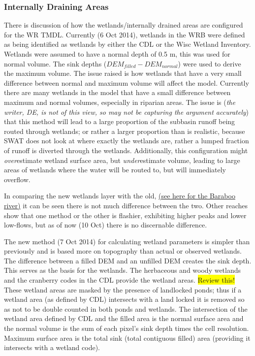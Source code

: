 \documentclass[10pt,letterpaper]{article}%
\begin{document}
		\subsubsection{Internally Draining Areas}
		There is discussion of how the wetlands/internally drained areas are configured for the WR TMDL. Currently (6 Oct 2014), wetlands in the WRB were defined as being identified as wetlands by either the CDL or the Wisc Wetland Inventory. Wetlands were assumed to have a normal depth of 0.5 m, this was used for normal volume. The sink depths ($DEM_{filled} - DEM_{normal}$) were used to derive the maximum volume. The issue raised is how wetlands that have a very small difference between normal and maximum volume will affect the model. Currently there are many wetlands in the model that have a small difference between maximum and normal volumes, especially in riparian areas. The issue is (\emph{the writer, DE, is not of this view, so may not be capturing the argument accurately}) that this method will lead to a large proportion of the subbasin runoff being routed through  wetlands; or rather a larger proportion than is realistic, because SWAT does not look at where exactly the wetlands are, rather a lumped fraction of runoff is diverted through the wetlands. Additionally, this configuration might \textit{over}estimate wetland surface area, but \textit{under}estimate volume, leading to large areas of wetlands where the water will be routed to, but will immediately overflow.
		
		In comparing the new wetlands layer with the old, \href{run:T:/Projects/Wisconsin_River/Model_Documents/TMDL_report/figures/calibration_validation_figures/newVSold_wetlands/defaults_137.pdf}{(see here for the Baraboo river)} it can be seen there is not much difference between the two. Other reaches show that one method or the other is flashier, exhibiting higher peaks and lower low-flows, but as of now (10 Oct) there is no discernable difference. 
		
		The new method (7 Oct 2014) for calculating wetland parameters is simpler than previously and is based more on topography than actual or observed wetlands. The difference between a filled DEM and an unfilled DEM creates the sink depth. This serves as the basis for the wetlands. The herbaceous and woody wetlands and the cranberry codes in the CDL provide the wetland areas. \colorbox{yellow}{Review this!} These wetland areas are masked by the presence of landlocked ponds; thus if a wetland area (as defined by CDL) intersects with a land locked it is removed so as not to be double counted in both ponds and wetlands. The intersection of the wetland area defined by CDL and the filled area is the normal surface area and the normal volume is the sum of each pixel's sink depth times the cell resolution. Maximum surface area is the total sink (total contiguous filled) area (providing it intersects with a wetland code).    	
			
\end{document}
